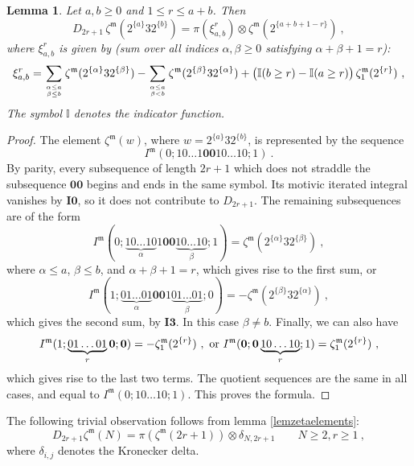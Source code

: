 \documentclass[10pt]{amsart}
\newtheorem{lem}[thm]{Lemma}
\theoremstyle{definition}
\theoremstyle{remark}
\numberwithin{equation}{section}
\newcommand{\Io}{\mathbf{I0}}
\newcommand{\Iiii}{\mathbf{I3}}
\newcommand{\zetam}{\zeta^{ \mathfrak{m}}}
\newcommand{\Imot}{I^{\mathfrak{m}}}
\newcommand{\oo}{\mathbf{00}}
\newcommand{\os}{\mathbf{0}}
\begin{document}
\begin{lem} \label{coprodlevel1} Let $a,b\geq 0$ and $1\leq r \leq  a+b$.  Then   
$$D_{2r+1}\,  \zetam(2^{\{a\}}32^{\{b\}}) = \pi(\xi^r_{a,b}) \otimes \zetam(2^{\{a+b+1-r\}})\ ,$$
 where $\xi^r_{a,b}$ is given by (sum over all indices $\alpha,\beta\geq0 $ satisfying $\alpha+\beta+1=r$): 
 $$\xi^r_{a,b}= \sum_{{\alpha\leq a \atop \beta \leq b}} \zetam(2^{\{\alpha\}} 3 2^{\{\beta\}})  - \sum_{\alpha \leq a \atop \beta< b} \zetam(2^{\{\beta\}} 3 2^{\{\alpha\}}) +\big(\mathbb{I}(b\geq r) -\mathbb{I}(a\geq r)\big)\, \zetam_1(2^{\{r\}}) \ ,$$
 The symbol $\mathbb{I}$ denotes the indicator function.
\end{lem}
\begin{proof}  The element $\zetam(w)$, where $w=2^{\{a\}}32^{\{b\}}$,  is represented by the sequence
$$\Imot(0;10\ldots 1{\oo}10 \ldots 10;1)\ .$$
By parity, every subsequence of length $2r+1$ which does not straddle the  subsequence ${\oo}$    begins and ends in the same symbol. Its motivic iterated integral vanishes by $\Io$,
so it does not contribute to $D_{2r+1}$.
 The remaining  subsequences are of the form 
 $$\Imot(0;\underbrace{10\ldots 10}_{\alpha}1\oo\underbrace{10 \ldots 10}_{\beta};1)=\zetam(2^{\{\alpha\}}32^{\{\beta\}})\ ,$$ 
 where $\alpha \leq a$, $\beta\leq b$, and $\alpha+\beta+1=r$, which gives rise to the first sum,
 or
 $$\Imot(1;\underbrace{01\ldots 01}_{\alpha}\oo1\underbrace{01 \ldots 01}_{\beta};0)=-\zetam(2^{\{\beta\}}32^{\{\alpha\}})\ ,$$ which gives  the second sum, by $\Iiii$. 
 In this case $\beta\neq b$. Finally, we can also have 
$$\Imot(1;\underbrace{01\ldots 01}_{r}\os;\os)=-\zetam_1(2^{\{r\}})\ , \hbox{ or } \Imot(\os; \os \underbrace{10\ldots 10}_{r};1)=\zetam_1(2^{\{r\}})\ ,$$
which gives rise to the last two terms. The quotient sequences are the same in all cases,  and equal to $\Imot(0;10\ldots 10;1)$. This  proves the formula. \end{proof}

The following trivial observation follows from lemma \ref{lemzetaelements}:
\begin{equation} \label{trivob}
D_{2r+1} \zetam(N) = \pi(\zetam(2r+1)) \otimes  \delta_{N,2r+1}  \qquad N\geq 2, r\geq 1 \ ,  
\end{equation} 
where $\delta_{i,j}$ denotes the Kronecker delta.
\end{document}
